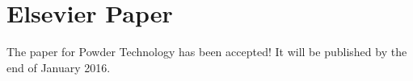 
\section{Elsevier Paper}
\label{sec:elsevierpaper}

The paper for Powder Technology has been accepted!
It will be published by the end of January 2016.\\
